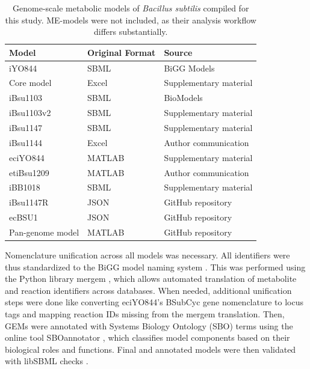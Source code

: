\documentclass[11pt, a4paper]{article}
\begin{document}
\begin{table}[H]
\centering
\caption{Genome-scale metabolic models of \textit{Bacillus subtilis} compiled for this study. ME-models were not included, as their analysis workflow differs substantially.}
\label{tab:model_compilation}
\begin{tabular}{lll}
\hline
\textbf{Model} & \textbf{Original Format} & \textbf{Source} \\
\hline
iYO844 & SBML & BiGG Models \\
Core model & Excel & Supplementary material \\
iBsu1103 & SBML & BioModels \\
iBsu1103v2 & SBML & Supplementary material \\
iBsu1147 & SBML & Supplementary material \\
iBsu1144 & Excel & Author communication \\
eciYO844 & MATLAB & Supplementary material \\
etiBsu1209 & MATLAB & Author communication \\
iBB1018 & SBML & Supplementary material \\
iBsu1147R & JSON & GitHub repository \\
ecBSU1 & JSON & GitHub repository \\
Pan-genome model & MATLAB & GitHub repository \\
\hline
\end{tabular}
\end{table}

Nomenclature unification across all models was necessary. All identifiers were thus standardized to the BiGG model naming system \parencite{king-2015}. This was performed using the Python library mergem \parencite{hari-2024}, which allows automated translation of metabolite and reaction identifiers across databases. When needed, additional unification steps were done like converting eciYO844's BSubCyc gene nomenclature to locus tags and mapping reaction IDs missing from the mergem translation. 
Then, GEMs were annotated with Systems Biology Ontology (SBO) terms using the online tool SBOannotator \parencite{leonidou-2023}, which classifies model components based on their biological roles and functions. Final and annotated models were then validated with libSBML checks \parencite{bornstein-2008}.
\end{document}
